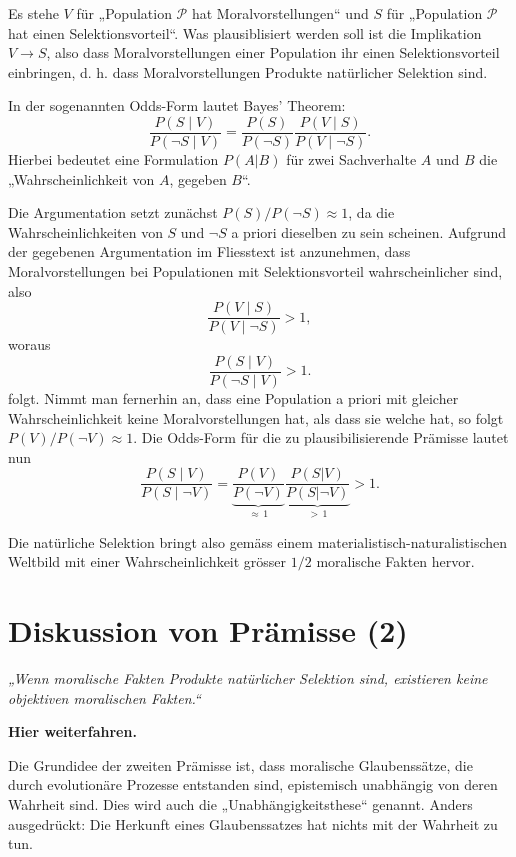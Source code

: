 \documentclass[11pt,a4paper]{article}
\begin{document}
	\begin{tcolorbox}[title=Mathematik-Box: Prämisse 1]
		Es stehe \(V\) für „Population \(\mathcal{P}\) hat Moralvorstellungen“ und \(S\) für „Population \(\mathcal{P}\) hat einen Selektionsvorteil“. Was plausiblisiert werden soll ist die Implikation $V \rightarrow S$, also dass Moralvorstellungen einer Population ihr einen Selektionsvorteil einbringen, d. h. dass Moralvorstellungen Produkte natürlicher Selektion sind. 
		
		In der sogenannten Odds-Form lautet Bayes' Theorem:
		\[
		\frac{P(S\mid V)}{P(\neg S\mid V)}
		=
		\frac{P(S)}{P(\neg S)}
		\frac{P(V\mid S)}{P(V\mid\neg S)}.
		\]
		Hierbei bedeutet eine Formulation $P(A|B)$ für zwei Sachverhalte $A$ und $B$ die „Wahrscheinlichkeit von $A$, gegeben $B$“.
		
		Die Argumentation setzt zunächst \(P(S)/P(\neg S)\approx 1\), da die Wahrscheinlichkeiten von $S$ und $\neg S$ a priori dieselben zu sein scheinen. Aufgrund der gegebenen Argumentation im Fliesstext ist anzunehmen, dass Moralvorstellungen bei Populationen mit Selektionsvorteil wahrscheinlicher sind, also
		\[
		\frac{P(V\mid S)}{P(V\mid\neg S)}> 1,
		\]
		woraus
		\[
		\frac{P(S\mid V)}{P(\neg S\mid V)}>1.
		\]
		folgt. Nimmt man fernerhin an, dass eine Population a priori mit gleicher Wahrscheinlichkeit keine Moralvorstellungen hat, als dass sie welche hat, so folgt $P(V)/P(\neg V) \approx 1$. Die Odds-Form für die zu plausibilisierende Prämisse lautet nun
		$$\frac{P(S\mid V)}{P(S\mid\neg V)} = \underbrace{\frac{P(V)}{P(\neg V)}}_{\approx \,1} \underbrace{\frac{P(S|V)}{P(S|\neg V)}}_{>\,1} > 1.$$
		
		Die natürliche Selektion bringt also gemäss einem materialistisch-naturalistischen Weltbild mit einer Wahrscheinlichkeit grösser $1/2$ moralische Fakten hervor.
	\end{tcolorbox}
	
	\section{Diskussion von Prämisse (2)}
	
	\textit{„Wenn moralische Fakten Produkte natürlicher Selektion sind, existieren keine objektiven moralischen Fakten.“}
	
	\textbf{Hier weiterfahren.}
	
	Die Grundidee der zweiten Prämisse ist, dass moralische Glaubenssätze, die durch evolutionäre Prozesse entstanden sind, epistemisch unabhängig von deren Wahrheit sind. Dies wird auch die „Unabhängigkeitsthese“ genannt. Anders ausgedrückt: Die Herkunft eines Glaubenssatzes hat nichts mit der Wahrheit zu tun.
	
\end{document}

